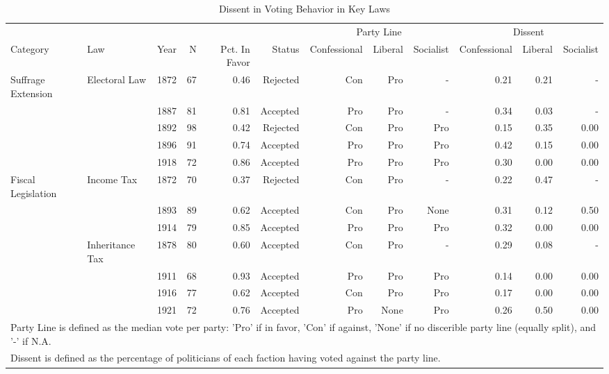 \begin{table}

\caption{\label{tab:descriptivestats_dissent}Dissent in Voting Behavior in Key Laws}
\centering
\begin{tabular}[t]{lllrrrrrrrrr}
\toprule
\multicolumn{6}{c}{ } & \multicolumn{3}{c}{Party Line} & \multicolumn{3}{c}{Dissent} \\
\cmidrule(l{3pt}r{3pt}){7-9} \cmidrule(l{3pt}r{3pt}){10-12}
Category & Law & Year & N & Pct. In Favor & Status & Confessional & Liberal & Socialist & Confessional  & Liberal  & Socialist \\
\midrule
Suffrage Extension & Electoral Law & 1872 & 67 & \num{0.46} & Rejected & Con & Pro & - & \num{0.21} & \num{0.21} & -\\
 &  & 1887 & 81 & \num{0.81} & Accepted & Pro & Pro & - & \num{0.34} & \num{0.03} & -\\
 &  & 1892 & 98 & \num{0.42} & Rejected & Con & Pro & Pro & \num{0.15} & \num{0.35} & \num{0.00}\\
 &  & 1896 & 91 & \num{0.74} & Accepted & Pro & Pro & Pro & \num{0.42} & \num{0.15} & \num{0.00}\\
 &  & 1918 & 72 & \num{0.86} & Accepted & Pro & Pro & Pro & \num{0.30} & \num{0.00} & \num{0.00}\\
Fiscal Legislation & Income Tax & 1872 & 70 & \num{0.37} & Rejected & Con & Pro & - & \num{0.22} & \num{0.47} & -\\
 &  & 1893 & 89 & \num{0.62} & Accepted & Con & Pro & None & \num{0.31} & \num{0.12} & \num{0.50}\\
 &  & 1914 & 79 & \num{0.85} & Accepted & Pro & Pro & Pro & \num{0.32} & \num{0.00} & \num{0.00}\\
 & Inheritance Tax & 1878 & 80 & \num{0.60} & Accepted & Con & Pro & - & \num{0.29} & \num{0.08} & -\\
 &  & 1911 & 68 & \num{0.93} & Accepted & Pro & Pro & Pro & \num{0.14} & \num{0.00} & \num{0.00}\\
 &  & 1916 & 77 & \num{0.62} & Accepted & Con & Pro & Pro & \num{0.17} & \num{0.00} & \num{0.00}\\
 &  & 1921 & 72 & \num{0.76} & Accepted & Pro & None & Pro & \num{0.26} & \num{0.50} & \num{0.00}\\
\bottomrule
\multicolumn{12}{l}{\rule{0pt}{1em}Party Line is defined as the median vote per party: 'Pro' if in favor, 'Con' if against, 'None' if no discerible party line (equally split), and '-' if N.A.}\\
\multicolumn{12}{l}{\rule{0pt}{1em}Dissent is defined as the percentage of politicians of each faction having voted against the party line.}\\
\end{tabular}
\end{table}
